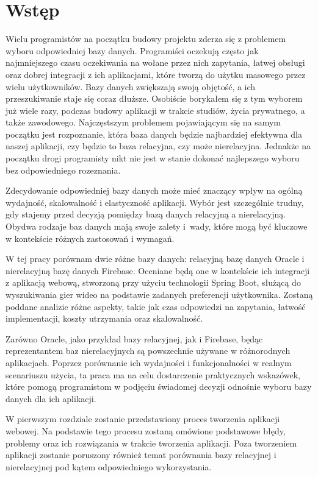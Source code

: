 \chapter*{Wstęp}


Wielu programistów na początku budowy projektu zderza się z problemem wyboru odpowiedniej bazy danych. Programiści oczekują często jak najmniejszego czasu oczekiwania na wołane przez nich zapytania, łatwej obsługi oraz dobrej integracji z ich aplikacjami, które tworzą do użytku masowego przez wielu użytkowników. Bazy danych zwiększają swoją objętość, a  ich przeszukiwanie staje się coraz dłuższe. Osobiście borykałem się z tym wyborem już wiele razy, podczas budowy aplikacji w trakcie studiów, życia prywatnego, a także zawodowego. Najczęstszym problemem pojawiającym się na samym początku jest rozpoznanie, która baza danych będzie najbardziej efektywna dla naszej aplikacji, czy będzie to baza relacyjna, czy może nierelacyjna. Jednakże na początku drogi programisty nikt nie jest w stanie dokonać najlepszego wyboru bez odpowiedniego rozeznania.

Zdecydowanie odpowiedniej bazy danych może mieć znaczący wpływ na ogólną wydajność, skalowalność i elastyczność aplikacji. Wybór jest szczególnie trudny, gdy stajemy przed decyzją pomiędzy bazą danych relacyjną a nierelacyjną. Obydwa rodzaje baz danych mają swoje zalety i~wady, które mogą być kluczowe w kontekście różnych zastosowań i wymagań.

W tej pracy porównam dwie różne bazy danych: relacyjną bazę danych Oracle i nierelacyjną bazę danych Firebase. Oceniane będą one w kontekście ich integracji z aplikacją webową, stworzoną przy użyciu technologii Spring Boot, służącą do wyszukiwania gier wideo na podstawie zadanych preferencji użytkownika. Zostaną poddane analizie różne aspekty, takie jak czas odpowiedzi na zapytania, łatwość implementacji, koszty utrzymania oraz skalowalność.

Zarówno Oracle, jako przykład bazy relacyjnej, jak i Firebase, będąc reprezentantem baz nierelacyjnych są powszechnie używane w różnorodnych aplikacjach. Poprzez porównanie ich wydajności i funkcjonalności w realnym scenariuszu użycia, ta praca ma na celu dostarczenie praktycznych wskazówek, które pomogą programistom w podjęciu świadomej decyzji odnośnie wyboru bazy danych dla ich aplikacji.

W pierwszym rozdziale zostanie przedstawiony proces tworzenia aplikacji webowej. Na podstawie tego procesu zostaną omówione podstawowe błędy, problemy oraz ich rozwiązania w trakcie tworzenia aplikacji. Poza tworzeniem aplikacji zostanie poruszony również temat porównania bazy relacyjnej i nierelacyjnej pod kątem odpowiedniego wykorzystania.

